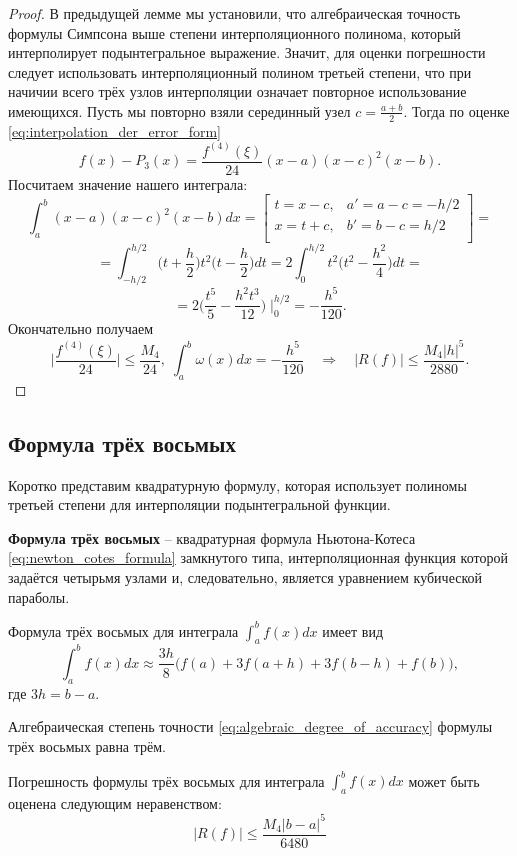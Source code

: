 \documentclass[../main.tex]{subfile}
\begin{document}
\begin{proof}
	В предыдущей лемме мы установили, что алгебраическая точность формулы
	Симпсона выше степени интерполяционного полинома, который интерполирует
	подынтегральное выражение. Значит, для оценки погрешности следует
	использовать интерполяционный полином третьей степени, что при начичии
	всего трёх узлов интерполяции означает повторное использование
	имеющихся. Пусть мы повторно взяли серединный узел $c=\frac{a+b}{2}$.
	Тогда по оценке \eqref{eq:interpolation_der_error_form}
	\[f(x)-P_3(x)=\frac{f^{(4)}(\xi)}{24}(x-a)(x-c)^2(x-b).\]
	Посчитаем значение нашего интеграла:
	\[\int_a^b (x-a)(x-c)^2(x-b)dx=
		\begin{bmatrix}
			t=x-c,	& a'=a-c=-h/2 \\
			x=t+c,	& b'=b-c=h/2\\
		\end{bmatrix}
		=
	\]
	\[=\int_{-h/2}^{h/2}\Big(t+\frac{h}{2}\Big)t^2\Big(t-\frac{h}{2}\Big)dt=
	2\int_0^{h/2}t^2\Big(t^2-\frac{h^2}{4}\Big)dt=\]
	\[=2\Big(\frac{t^5}{5}-\frac{h^2t^3}{12}\Big)\;\Big|_0^{h/2}=
	-\frac{h^5}{120}.\]
	Окончательно получаем
	\[\Big|\frac{f^{(4)}(\xi)}{24}\Big|\le\frac{M_4}{24},\;\int_a^b\omega(x)
	dx=-\frac{h^5}{120}\quad\Rightarrow\quad|R(f)|\le\frac{M_4|h|^5}{2880}.\]
\end{proof}

\subsection{Формула трёх восьмых}
Коротко представим квадратурную формулу, которая использует полиномы третьей
степени для интерполяции подынтегральной функции.

\begin{define}
	\textbf{Формула трёх восьмых} -- квадратурная формула Ньютона-Котеса
	\eqref{eq:newton_cotes_formula} замкнутого типа, интерполяционная
	функция которой задаётся четырьмя узлами и, следовательно, является
	уравнением кубической параболы.
\end{define}

\begin{theorem}
	Формула трёх восьмых для интеграла $\int_a^b f(x)dx$ имеет вид
	\[\boxed{\int_a^b f(x)dx\approx\frac{3h}{8}\big(f(a)+3f(a+h)+3f(b-h)+
	f(b)\big)},\]
	где $3h=b-a$.
\end{theorem}
\proofexercise

\begin{lemma}
	Алгебраическая степень точности \eqref{eq:algebraic_degree_of_accuracy}
	формулы трёх восьмых равна трём.
\end{lemma}
\proofexercise

\begin{theorem}
	Погрешность формулы трёх восьмых для интеграла $\int_a^b f(x)dx$ может
	быть оценена следующим неравенством:
	\[\boxed{|R(f)|\le\frac{M_4|b-a|^5}{6480}}\]
\end{theorem}
\proofexercise
\end{document}
